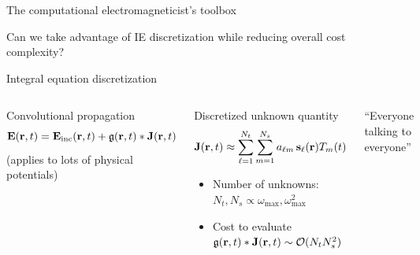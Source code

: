 \documentclass[aspectratio=169, usenames, dvipsnames]{beamer}
\begin{document}
\begin{frame}{The computational electromagneticist's toolbox}
    \vspace{-0.5cm}
      \begin{center}
        
      \end{center}
    \vspace{-1cm}
    Can we take advantage of IE discretization while reducing overall cost complexity?
\end{frame}

\begin{frame}{Integral equation discretization}
  \begin{columns}
    \begin{block}{Convolutional propagation}
      \begin{equation*}
        \vb{E}(\vb{r}, t) = \vb{E}_\text{inc}(\vb{r}, t) + \mathfrak{g}(\vb{r}, t) * \vb{J}(\vb{r}, t)
      \end{equation*}
      \hfill \tiny{(applies to lots of physical potentials)}
    \end{block}

    \begin{block}{Discretized unknown quantity}
      \begin{equation*}
        \vb{J}(\vb{r}, t) \approx \sum_{\ell=1}^{N_t} \sum_{m=1}^{N_s} a_{\ell m} \, \vb{s}_\ell(\vb{r}) T_m(t)
      \end{equation*}
      \begin{itemize}
        \item Number of unknowns: $N_t, N_s \propto \omega_\text{max}, \omega_\text{max}^2$
        \item Cost to evaluate $\mathfrak{g}(\vb{r}, t) * \vb{J}(\vb{r}, t) \sim \mathcal{O}(N_t N_s^2)$
      \end{itemize}
    \end{block}

      \begin{center}
        
        {\small ``Everyone talking to everyone''}
      \end{center}
  \end{columns}
\end{frame}
\end{document}
